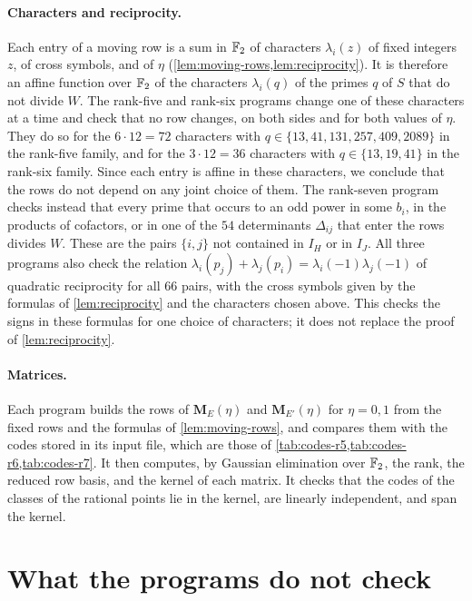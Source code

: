 \paragraph{Characters and reciprocity.} Each entry of a moving row is a sum in $\mathbb F_2$ of characters $\lambda_i(z)$ of fixed integers $z$, of cross symbols, and of $\eta$ (\cref{lem:moving-rows,lem:reciprocity}). It is therefore an affine function over $\mathbb F_2$ of the characters $\lambda_i(q)$ of the primes $q$ of $S$ that do not divide $W$. The rank-five and rank-six programs change one of these characters at a time and check that no row changes, on both sides and for both values of $\eta$. They do so for the $6\cdot12=72$ characters with $q\in\{13,41,131,257,409,2089\}$ in the rank-five family, and for the $3\cdot12=36$ characters with $q\in\{13,19,41\}$ in the rank-six family. Since each entry is affine in these characters, we conclude that the rows do not depend on any joint choice of them. The rank-seven program checks instead that every prime that occurs to an odd power in some $b_i$, in the products of cofactors, or in one of the $54$ determinants $\Delta_{ij}$ that enter the rows divides $W$. These are the pairs $\{i,j\}$ not contained in $I_H$ or in $I_J$. All three programs also check the relation $\lambda_i(p_j)+\lambda_j(p_i)=\lambda_i(-1)\lambda_j(-1)$ of quadratic reciprocity for all $66$ pairs, with the cross symbols given by the formulas of \cref{lem:reciprocity} and the characters chosen above. This checks the signs in these formulas for one choice of characters; it does not replace the proof of \cref{lem:reciprocity}.

\paragraph{Matrices.} Each program builds the rows of $\mathbf M_E(\eta)$ and $\mathbf M_{E'}(\eta)$ for $\eta=0,1$ from the fixed rows and the formulas of \cref{lem:moving-rows}, and compares them with the codes stored in its input file, which are those of \cref{tab:codes-r5,tab:codes-r6,tab:codes-r7}. It then computes, by Gaussian elimination over $\mathbb F_2$, the rank, the reduced row basis, and the kernel of each matrix. It checks that the codes of the classes of the rational points lie in the kernel, are linearly independent, and span the kernel.

\section{What the programs do not check}\label{sec:verification-limits}

